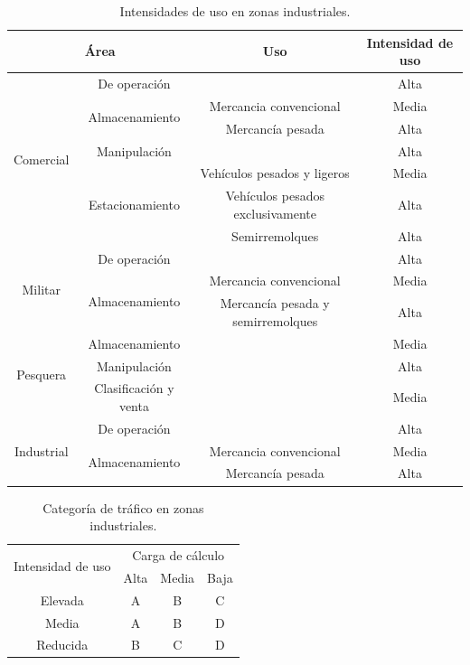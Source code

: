 \begin{table}[!htb]
\centering
\begin{tabular}{|c|c|c|c|}
\hline
\multicolumn{2}{|c|}{Área} & Uso & Intensidad de uso\\ \hline
\multirow{7}{*}{Comercial} & De operación &  & Alta\\ \cline{2-4}
& \multirow{2}{*}{Almacenamiento} & Mercancia convencional & Media\\ \cline{3-4}
& & Mercancía pesada & Alta\\ \cline{2-4}
& Manipulación & & Alta\\ \cline{2-4}
& \multirow{3}{*}{Estacionamiento} & Vehículos pesados y ligeros & Media\\ \cline{3-4}
& & Vehículos pesados exclusivamente & Alta\\ \cline{3-4}
& & Semirremolques & Alta\\ \hline
\multirow{3}{*}{Militar} & De operación &  & Alta\\ \cline{2-4}
& \multirow{2}{*}{Almacenamiento} & Mercancia convencional & Media\\ \cline{3-4}
& & Mercancía pesada y semirremolques & Alta\\ \hline
\multirow{3}{*}{Pesquera} & Almacenamiento &  & Media\\ \cline{2-4}
& Manipulación & & Alta\\ \cline{2-4}
& Clasificación y venta & & Media\\ \hline
\multirow{3}{*}{Industrial} & De operación &  & Alta\\ \cline{2-4}
& \multirow{2}{*}{Almacenamiento} & Mercancia convencional & Media\\ \cline{3-4}
& & Mercancía pesada & Alta\\ \hline
\end{tabular}
\caption{Intensidades de uso en zonas industriales.}
\label{categoriadetraficoenzonasindustrialesintensidades}
\end{table}


\begin{table}[!htb]
\centering
\begin{tabular}{|c|c|c|c|}
\hline
\multirow{2}{*}{Intensidad de uso} & \multicolumn{3}{c|}{Carga de cálculo} \\ \cline{2-4}
 & Alta & Media & Baja\\ \hline
Elevada & A & B & C\\ \hline
Media & A & B & D\\ \hline
Reducida & B & C & D\\ \hline
\end{tabular}
\caption{Categoría de tráfico en zonas industriales.}
\label{categoriadetraficoenzonasindustriales}
\end{table}

